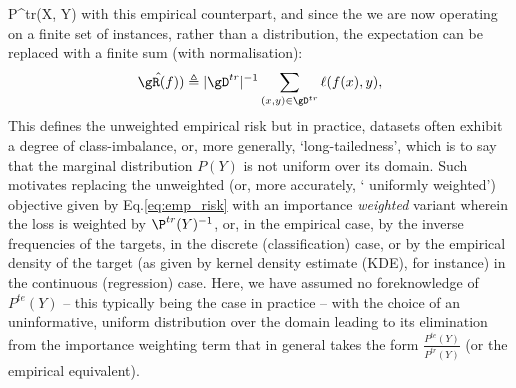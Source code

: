 P^{tr}(X, Y) \) with this empirical counterpart, and since the we are now operating on a finite set
of instances, rather than a distribution, the expectation can be replaced with a
finite sum (with normalisation):
%
\equ\begin{equation*} \label{eq:emp_risk} 
  \hat{\gR(f)}) \triangleq |\gD^{tr}|^{-1}  \sum_{(x, y) \in \gD^{tr}} \ell (f(x), y),
\end{equation*}
%
This defines the unweighted empirical risk but in practice, datasets often exhibit a degree of
class-imbalance, or, more generally, `long-tailedness', which is to say that the marginal
distribution \( P(Y) \) is not uniform over its domain.
%
Such motivates replacing the unweighted (or, more accurately, ` uniformly weighted') objective
given by Eq.\ref{eq:emp_risk} with an importance  \emph{weighted} variant wherein the loss is
weighted by \( \P^{tr}(Y)^{-1} \), or, in the empirical case, by the inverse frequencies of the
targets, in the discrete (classification) case, or by the empirical density of the target (as given
by kernel density estimate (KDE), for instance) in the continuous (regression) case.
%
Here, we have assumed no foreknowledge of \( P^{te}(Y) \) -- this typically being the case in
practice -- with the choice of an uninformative, uniform distribution over the domain leading to
its elimination from the importance weighting term that in general takes the form \( \frac{
  P^{te}(Y) }{ P^{tr}(Y) } \) (or the empirical equivalent).

